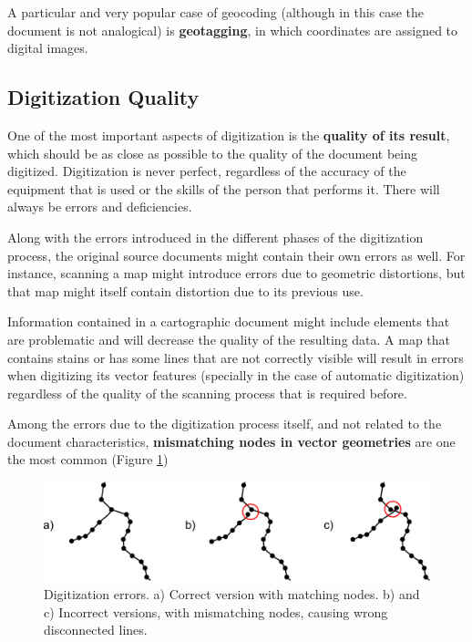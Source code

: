 A particular and very popular case of geocoding (although in this case the document is not analogical) is \textbf{geotagging}, in which coordinates are assigned to digital images.


\subsection{Digitization Quality}

One of the most important aspects of digitization is the \textbf{quality of its result}, which should be as close as possible to the quality of the document being digitized. Digitization is never perfect, regardless of the accuracy of the equipment that is used or the skills of the person that performs it. There will always be errors and deficiencies.

Along with the errors introduced in the different phases of the digitization process, the original source documents might contain their own errors as well. For instance, scanning a map might introduce errors due to geometric distortions, but that map might itself contain distortion due to its previous use.

Information contained in a cartographic document might include elements that are problematic and will decrease the quality of the resulting data. A map that contains stains or has some lines that are not correctly visible will result in errors when digitizing its vector features (specially in the case of automatic digitization) regardless of the quality of the scanning process that is required before. 
 
Among the errors due to the digitization process itself, and not related to the document characteristics, \textbf{mismatching nodes in vector geometries} are one the most common (Figure \ref{Fig:Errors_digitization})

\begin{figure}[!hbt]   
\centering
\includegraphics[width=\textwidth]{Data_sources/Errors_digitization.pdf}
\caption{\small Digitization errors. a) Correct version with matching nodes. b) and c) Incorrect versions, with mismatching nodes, causing wrong disconnected lines.}
\label{Fig:Errors_digitization} 
\end{figure}


